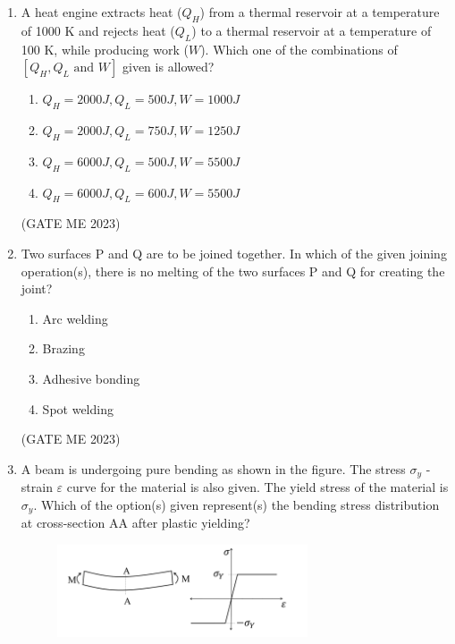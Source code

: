 \documentclass[journal]{IEEEtran}
\begin{document}
\begin{enumerate}
\item A heat engine extracts heat ($Q_H$) from a thermal reservoir at a temperature of 1000 K and rejects heat ($Q_L$) to a thermal reservoir at a temperature of 100 K, while producing work ($W$). Which one of the combinations of $[Q_H, Q_L \text{ and } W]$ given is allowed?

\begin{enumerate}
    \item $Q_H = 2000  J,  Q_L = 500  J,  W = 1000  J$
    \item $Q_H = 2000  J,  Q_L = 750  J,  W = 1250  J$
    \item $Q_H = 6000  J,  Q_L = 500  J,  W = 5500  J$
    \item $Q_H = 6000  J,  Q_L = 600  J,  W = 5500  J$
\end{enumerate}
\hfill (GATE ME 2023)

\item Two surfaces P and Q are to be joined together. In which of the given joining operation(s), there is no melting of the two surfaces P and Q for creating the joint?

\begin{enumerate}
    \item Arc welding
    \item Brazing
    \item Adhesive bonding
    \item Spot welding
\end{enumerate}
\hfill (GATE ME 2023)

\item A beam is undergoing pure bending as shown in the figure. The stress $ \sigma_y $ - strain $ \varepsilon $ curve for the material is also given. The yield stress of the material is $ \sigma_y $. Which of the option(s) given represent(s) the bending stress distribution at cross-section AA after plastic yielding?
\begin{figure}[H]
\centering
\includegraphics[width=0.7\textwidth]{Fig 15.png}
\caption{}
\label{fig:question24}
\end{figure}


\end{enumerate}
\end{document}
